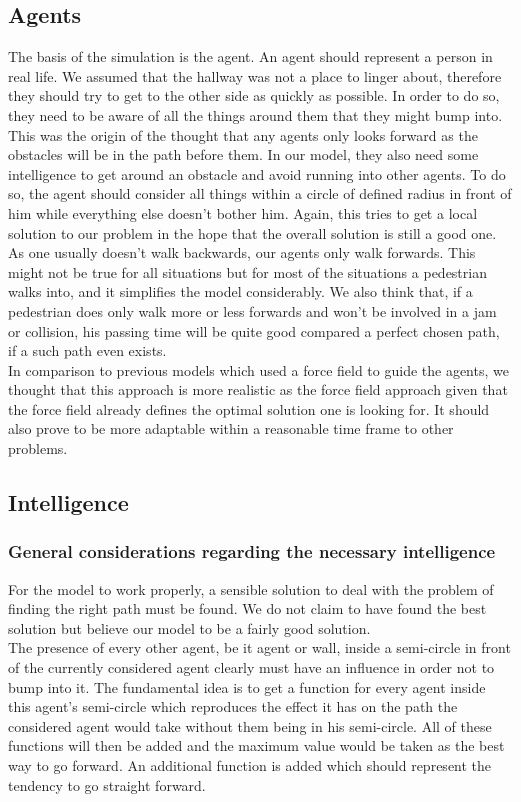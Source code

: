 \subsection{Agents}
The basis of the simulation is the agent. An agent should represent a person in real life. We assumed that the hallway was not a place to linger about, therefore they should try to get to the other side as quickly as possible. In order to do so, they need to be aware of all the things around them that they might bump into. This was the origin of the thought that any agents only looks forward as the obstacles will be in the path before them. In our model, they also need some intelligence to get around an obstacle and avoid running into other agents. To do so, the agent should consider all things within a circle of defined radius in front of him while everything else doesn't bother him. Again, this tries to get a local solution to our problem in the hope that the overall solution is still a good one. As one usually doesn't walk backwards, our agents only walk forwards. This might not be true for all situations but for most of the situations a pedestrian walks into, and it simplifies the model considerably. We also think that, if a pedestrian does only walk more or less forwards and won't be involved in a jam or collision, his passing time will be quite good compared a perfect chosen path, if a such path even exists.\\

\noi In comparison to previous models which used a force field to guide the agents, we thought that this approach is more realistic as the force field approach given that the force field already defines the optimal solution one is looking for. It should also prove to be more adaptable within a reasonable time frame to other problems.

\subsection{Intelligence}
\subsubsection{General considerations regarding the necessary intelligence}
For the model to work properly, a sensible solution to deal with the problem of finding the right path must be found. We do not claim to have found the best solution but believe our model to be a fairly good solution.\\
The presence of every other agent, be it agent or wall, inside a semi-circle in front of the currently considered agent clearly must have an influence in order not to bump into it. The fundamental idea is to get a function for every agent inside this agent's semi-circle which reproduces the effect it has on the path the considered agent would take without them being in his semi-circle. All of these functions will then be added and the maximum value would be taken as the best way to go forward. An additional function is added which should represent the tendency to go straight forward.\\


